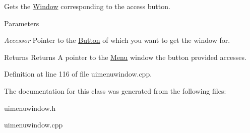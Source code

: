 Gets the \hyperlink{classphys_1_1UI_1_1Window}{Window} corresponding to the access button. 


\begin{DoxyParams}{Parameters}
\item[{\em Accessor}]Pointer to the \hyperlink{classphys_1_1UI_1_1Button}{Button} of which you want to get the window for. \end{DoxyParams}
\begin{DoxyReturn}{Returns}
Returns A pointer to the \hyperlink{classphys_1_1UI_1_1Menu}{Menu} window the button provided accesses. 
\end{DoxyReturn}


Definition at line 116 of file uimenuwindow.cpp.



The documentation for this class was generated from the following files:\begin{DoxyCompactItemize}
\item 
uimenuwindow.h\item 
uimenuwindow.cpp\end{DoxyCompactItemize}
